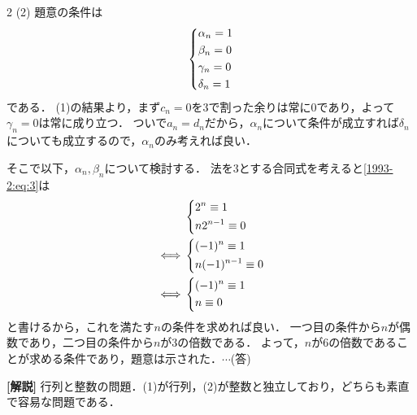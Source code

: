 \documentclass[../../main.tex]{subfiles}
\begin{document}
\begin{multicols}{2}
  \vspace{10pt}
  (2)
  題意の条件は
  \begin{align}
    \begin{dcases}
      \alpha_n = 1 \\
      \beta_n =  0 \\
      \gamma_n = 0 \\
      \delta_n = 1
    \end{dcases}\label{1993-2:eq:3}
  \end{align}
  である．
  (1)の結果より，まず$c_n=0$を$3$で割った余りは常に$0$であり，よって$\gamma_n=0$は常に成り立つ．
  ついで$a_n=d_n$だから，$\alpha_n$について条件が成立すれば$\delta_n$についても成立するので，$\alpha_n$のみ考えれば良い．

  そこで以下，$\alpha_n,\beta_n$について検討する．
  法を$3$とする合同式を考えると\cref{1993-2:eq:3}は
  \begin{align*}
     & \begin{dcases}
         2^{n} \equiv 1 \\
         n2^{n-1} \equiv 0
       \end{dcases}    \\
    \iff
     & \begin{dcases}
         (-1)^{n} \equiv 1 \\
         n(-1)^{n-1} \equiv 0
       \end{dcases} \\
    \iff
     & \begin{dcases}
         (-1)^{n} \equiv 1 \\
         n \equiv 0
       \end{dcases}
  \end{align*}
  と書けるから，これを満たす$n$の条件を求めれば良い．
  一つ目の条件から$n$が偶数であり，二つ目の条件から$n$が$3$の倍数である．
  よって，$n$が$6$の倍数であることが求める条件であり，題意は示された．$\cdots$(答)

  \vspace{10pt}
  {\bf[解説]}
  行列と整数の問題．(1)が行列，(2)が整数と独立しており，どちらも素直で容易な問題である．


\end{multicols}
\end{document}
